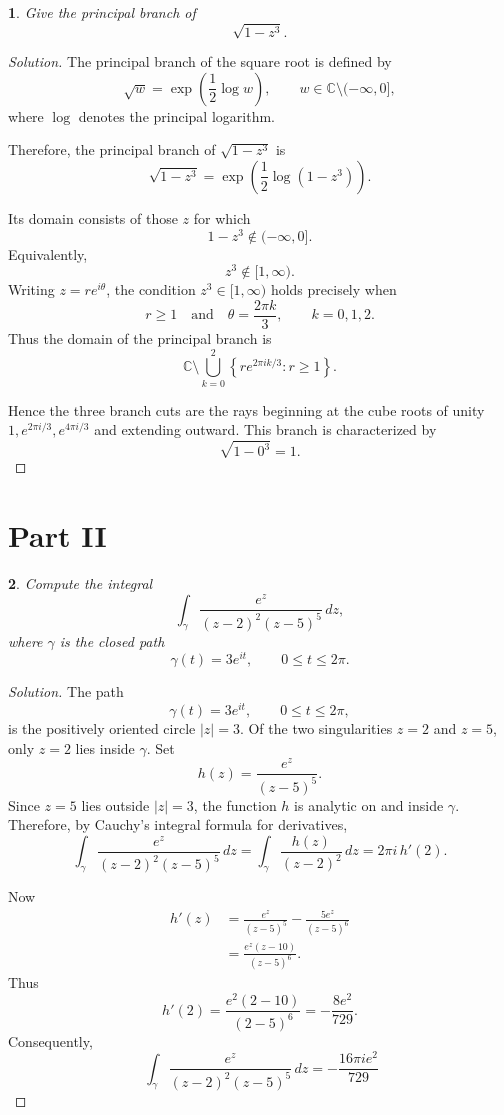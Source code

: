 \documentclass[12pt, a4paper]{report}
\theoremstyle{spaced}
\newtheorem{exercise}{}
\DeclareMathOperator{\Log}{log}
\begin{document}
\begin{exercise}
	Give the principal branch of
	\[
		\sqrt{1-z^3}.
	\]
\end{exercise}
\begin{proof}[Solution]
	The principal branch of the square root is defined by
	\[
	\sqrt{w}=\exp\left(\frac12\Log w\right),
	\qquad
	w\in\mathbb C\setminus(-\infty,0],
	\]
	where \(\Log\) denotes the principal logarithm.

	Therefore, the principal branch of \(\sqrt{1-z^3}\) is
	\[
	\sqrt{1-z^3}
	=
	\exp\left(\frac12\Log(1-z^3)\right)
	.
	\]

	Its domain consists of those \(z\) for which
	\[
	1-z^3\notin(-\infty,0].
	\]
	Equivalently,
	\[
	z^3\notin[1,\infty).
	\]
	Writing \(z=re^{i\theta}\), the condition \(z^3\in[1,\infty)\) holds
	precisely when
	\[
		r\geq 1
		\quad\text{and}\quad
		\theta=\frac{2\pi k}{3},
		\qquad k=0,1,2.
	\]
	Thus the domain of the principal branch is
	\[
		\mathbb C\setminus
		\bigcup_{k=0}^{2}
		\left\{
		re^{2\pi i k/3}:r\geq1
		\right\}.
	\]

	Hence the three branch cuts are the rays beginning at the cube roots
	of unity \(1,e^{2\pi i/3},e^{4\pi i/3}\) and extending outward. This
	branch is characterized by
	\[
		\sqrt{1-0^3}=1.
	\]
\end{proof}
\section{Part II}
\begin{exercise}
	Compute the integral
	\[
		\int_{\gamma}
		\frac{e^z}{(z-2)^2(z-5)^5}\,dz,
	\]
	where $\gamma$ is the closed path
	\[
		\gamma(t)=3e^{it},
		\qquad 0\leq t\leq 2\pi.
	\]
\end{exercise}
\begin{proof}[Solution]
	The path
	\[
		\gamma(t)=3e^{it},\qquad 0\leq t\leq 2\pi,
	\]
	is the positively oriented circle \(|z|=3\). Of the two singularities
	\(z=2\) and \(z=5\), only \(z=2\) lies inside \(\gamma\).
	Set
	\[
		h(z)=\frac{e^z}{(z-5)^5}.
	\]
	Since \(z=5\) lies outside \(|z|=3\), the function \(h\) is analytic on
	and inside \(\gamma\). Therefore, by Cauchy's integral formula for
	derivatives,
	\[
		\int_{\gamma}\frac{e^z}{(z-2)^2(z-5)^5}\,dz
		=
		\int_{\gamma}\frac{h(z)}{(z-2)^2}\,dz
		=
		2\pi i\,h'(2).
	\]

	Now
	\[
		\begin{aligned}
			h'(z)
			 & =
			\frac{e^z}{(z-5)^5}
			-\frac{5e^z}{(z-5)^6} \\
			 & =
			\frac{e^z(z-10)}{(z-5)^6}.
		\end{aligned}
	\]
	Thus
	\[
		h'(2)
		=
		\frac{e^2(2-10)}{(2-5)^6}
		=
		-\frac{8e^2}{729}.
	\]
	Consequently,
	\[
		\
		\int_{\gamma}
		\frac{e^z}{(z-2)^2(z-5)^5}\,dz
		=
		-\frac{16\pi i e^2}{729}
	\]
\end{proof}
\end{document}
